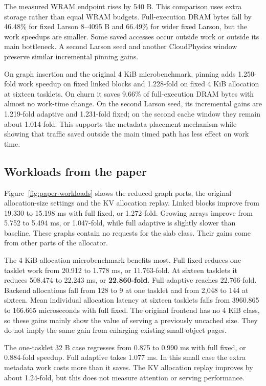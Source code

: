 \documentclass[conference]{IEEEtran}
\begin{document}
The measured WRAM endpoint rises by 540 B. This comparison uses extra storage rather than equal WRAM budgets. Full-execution DRAM bytes fall by 46.48\% for fixed Larson 8--4095 B and 66.49\% for wider fixed Larson, but the work speedups are smaller. Some saved accesses occur outside work or outside its main bottleneck. A second Larson seed and another CloudPhysics window preserve similar incremental pinning gains.

On graph insertion and the original 4 KiB microbenchmark, pinning adds 1.250-fold work speedup on fixed linked blocks and 1.228-fold on fixed 4 KiB allocation at sixteen tasklets. On churn it saves 9.66\% of full-execution DRAM bytes with almost no work-time change. On the second Larson seed, its incremental gains are 1.219-fold adaptive and 1.231-fold fixed; on the second cache window they remain about 1.014-fold. This supports the metadata-placement mechanism while showing that traffic saved outside the main timed path has less effect on work time.

\subsection{Workloads from the paper}

Figure~\ref{fig:paper-workloads} shows the reduced graph ports, the original allocation-size settings and the KV allocation replay. Linked blocks improve from 19.330 to 15.198 ms with full fixed, or 1.272-fold. Growing arrays improve from 5.752 to 5.494 ms, or 1.047-fold, while full adaptive is slightly slower than baseline. These graphs contain no requests for the slab class. Their gains come from other parts of the allocator.

The 4 KiB allocation microbenchmark benefits most. Full fixed reduces one-tasklet work from 20.912 to 1.778 ms, or 11.763-fold. At sixteen tasklets it reduces 508.474 to 22.243 ms, or \textbf{22.860-fold}. Full adaptive reaches 22.766-fold. Backend allocations fall from 128 to 9 at one tasklet and from 2,048 to 144 at sixteen. Mean individual allocation latency at sixteen tasklets falls from 3960.865 to 166.665 microseconds with full fixed. The original frontend has no 4 KiB class, so these gains mainly show the value of serving a previously uncached size. They do not imply the same gain from enlarging existing small-object pages.

The one-tasklet 32 B case regresses from 0.875 to 0.990 ms with full fixed, or 0.884-fold speedup. Full adaptive takes 1.077 ms. In this small case the extra metadata work costs more than it saves. The KV allocation replay improves by about 1.24-fold, but this does not measure attention or serving performance.
\end{document}
